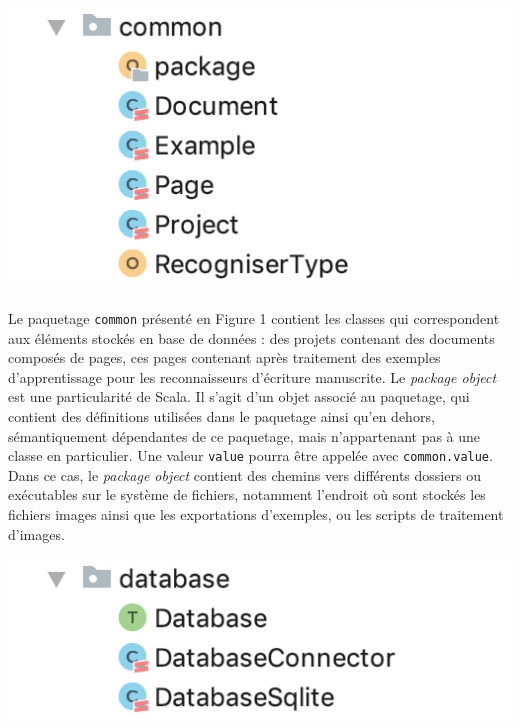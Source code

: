 \begin{mdframed}[frametitle={Figure 1 : Paquetage \texttt{common}}, innerbottommargin=10]
\begin{center}
\includegraphics[scale=0.7]{assets/common.png}
\end{center}
\end{mdframed}

\paragraph{}
Le paquetage \texttt{common} présenté en Figure 1 contient les classes qui correspondent aux éléments stockés en base de données : des projets contenant des documents composés de pages, ces pages contenant après traitement des exemples d'apprentissage pour les reconnaisseurs d'écriture manuscrite. Le \textit{package object} est une particularité de Scala. Il s'agit d'un objet associé au paquetage, qui contient des définitions utilisées dans le paquetage ainsi qu'en dehors, sémantiquement dépendantes de ce paquetage, mais n'appartenant pas à une classe en particulier. Une valeur \texttt{value} pourra être appelée avec \texttt{common.value}. Dans ce cas, le \textit{package object} contient des chemins vers différents dossiers ou exécutables sur le système de fichiers, notamment l'endroit où sont stockés les fichiers images ainsi que les exportations d'exemples, ou les scripts de traitement d'images.

\begin{mdframed}[frametitle={Figure 1 : Paquetage \texttt{database}}, innerbottommargin=10]
\begin{center}
\includegraphics[scale=0.7]{assets/database.png}
\end{center}
\end{mdframed}

